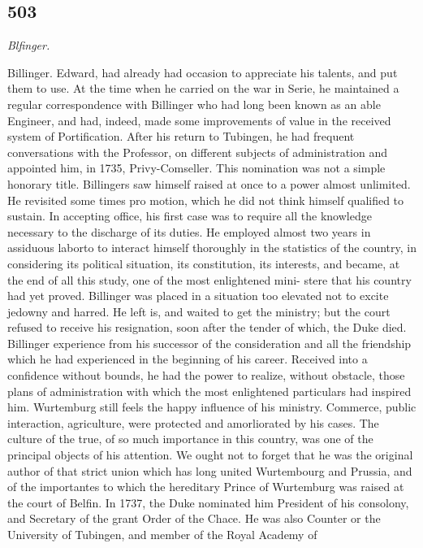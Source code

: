 \subsection*{503}
{\small\itshape Blfinger.\par}\medskip
Billinger. Edward, had already had occasion to appreciate his talents, and put them to use. At the time when he carried on the war in Serie, he maintained a regular correspondence with Billinger who had long been known as an able Engineer, and had, indeed, made some improvements of value in the received system of Portification. After his return to Tubingen, he had frequent conversations with the Professor, on different subjects of administration and appointed him, in 1735, Privy-Comseller. This nomination was not a simple honorary title. Billingers saw himself raised at once to a power almost unlimited. He revisited some times pro motion, which he did not think himself qualified to sustain. In accepting office, his first case was to require all the knowledge necessary to the discharge of its duties. He employed almost two years in assiduous laborto to interact himself thoroughly in the statistics of the country, in considering its political situation, its constitution, its interests, and became, at the end of all this study, one of the most enlightened mini- stere that his country had yet proved. Billinger was placed in a situation too elevated not to excite jedowny and harred. He left is, and waited to get the ministry; but the court refused to receive his resignation, soon after the tender of which, the Duke died. Billinger experience from his successor of the consideration and all the friendship which he had experienced in the beginning of his career. Received into a confidence without bounds, he had the power to realize, without obstacle, those plans of administration with which the most enlightened particulars had inspired him. Wurtemburg still feels the happy influence of his ministry. Commerce, public interaction, agriculture, were protected and amorliorated by his cases. The culture of the true, of so much importance in this country, was one of the principal objects of his attention. We ought not to forget that he was the original author of that strict union which has long united Wurtembourg and Prussia, and of the importantes to which the hereditary Prince of Wurtemburg was raised at the court of Belfin. In 1737, the Duke nominated him President of his consolony, and Secretary of the grant Order of the Chace. He was also Counter or the University of Tubingen, and member of the Royal Academy of\par\medskip

